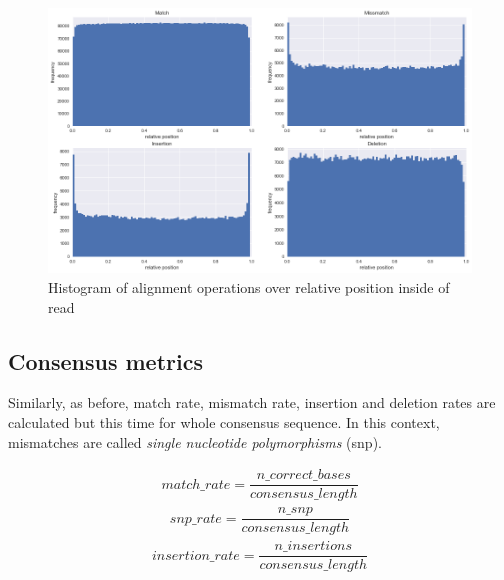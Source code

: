 \documentclass[runningheads,a4paper]{llncs}
\begin{document}
\begin{figure}[!ht]
	\begin{center}
		\includegraphics[width=1\textwidth]{./imgs/operation_distributed_r9.png}
		\caption{Histogram of alignment operations over relative position inside of read}
		\label{fg:cigar_op_dist}
	\end{center}
\end{figure}

\subsection{Consensus metrics}
\label{app:evaluation:consensus}

Similarly, as before, match rate, mismatch rate, insertion and deletion rates are calculated but this time for whole consensus sequence. In this context, mismatches are called \emph{single nucleotide polymorphisms} (snp).

\begin{equation}
\begin{gathered}
match\_rate = \dfrac{n\_correct\_bases}{consensus\_length}
\end{gathered}
\end{equation}
\begin{equation}
\begin{gathered}
snp\_rate = \dfrac{n\_snp}{consensus\_length}
\end{gathered}
\end{equation}
\begin{equation}
\begin{gathered}
insertion\_rate = \dfrac{n\_insertions}{consensus\_length}
\end{gathered}
\end{equation}
\end{document}
